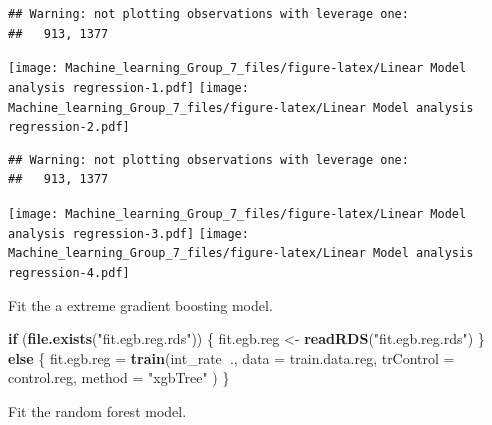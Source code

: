 \documentclass[]{article}
\newenvironment{Shaded}{\begin{snugshade}}{\end{snugshade}}
\newcommand{\ControlFlowTok}[1]{\textcolor[rgb]{0.13,0.29,0.53}{\textbf{#1}}}
\newcommand{\DataTypeTok}[1]{\textcolor[rgb]{0.13,0.29,0.53}{#1}}
\newcommand{\KeywordTok}[1]{\textcolor[rgb]{0.13,0.29,0.53}{\textbf{#1}}}
\newcommand{\NormalTok}[1]{#1}
\newcommand{\OperatorTok}[1]{\textcolor[rgb]{0.81,0.36,0.00}{\textbf{#1}}}
\newcommand{\StringTok}[1]{\textcolor[rgb]{0.31,0.60,0.02}{#1}}
\begin{document}
\begin{Shaded}
\end{Shaded}

\begin{verbatim}
## Warning: not plotting observations with leverage one:
##   913, 1377
\end{verbatim}

\texttt{[image: Machine\_learning\_Group\_7\_files/figure-latex/Linear Model analysis regression-1.pdf]}
\texttt{[image: Machine\_learning\_Group\_7\_files/figure-latex/Linear Model analysis regression-2.pdf]}

\begin{verbatim}
## Warning: not plotting observations with leverage one:
##   913, 1377
\end{verbatim}

\texttt{[image: Machine\_learning\_Group\_7\_files/figure-latex/Linear Model analysis regression-3.pdf]}
\texttt{[image: Machine\_learning\_Group\_7\_files/figure-latex/Linear Model analysis regression-4.pdf]}

Fit the a extreme gradient boosting model.

\begin{Shaded}
\begin{Highlighting}[]
\ControlFlowTok{if}\NormalTok{ (}\KeywordTok{file.exists}\NormalTok{(}\StringTok{"fit.egb.reg.rds"}\NormalTok{)) \{}
\NormalTok{   fit.egb.reg <-}\StringTok{ }\KeywordTok{readRDS}\NormalTok{(}\StringTok{"fit.egb.reg.rds"}\NormalTok{)}
\NormalTok{\} }\ControlFlowTok{else}\NormalTok{ \{}
\NormalTok{    fit.egb.reg =}\StringTok{ }\KeywordTok{train}\NormalTok{(int_rate}\OperatorTok{~}\NormalTok{.,}
                    \DataTypeTok{data =}\NormalTok{ train.data.reg,}
                    \DataTypeTok{trControl =}\NormalTok{ control.reg,}
                    \DataTypeTok{method =} \StringTok{"xgbTree"}
\NormalTok{    )}
\NormalTok{\}}
\end{Highlighting}
\end{Shaded}

Fit the random forest model.
\end{document}
